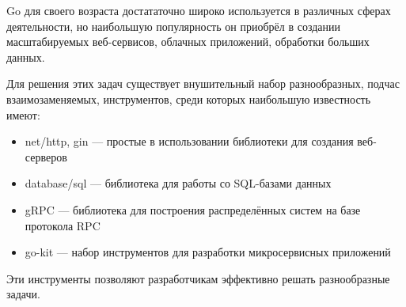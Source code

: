 Go для своего возраста достататочно широко используется в различных сферах деятельности, но наибольшую популярность он приобрёл в создании масштабируемых веб-сервисов, облачных приложений, обработки больших данных.

Для решения этих задач существует внушительный набор разнообразных, подчас взаимозаменяемых, инструментов, среди которых наибольшую известность имеют:

\begin{itemize}
  \item net/http, gin --- простые в использовании библиотеки для создания веб-серверов
  \item database/sql --- библиотека для работы со SQL-базами данных
  \item gRPC --- библиотека для построения распределённых систем на базе протокола RPC
  \item go-kit --- набор инструментов для разработки микросервисных приложений
\end{itemize}

Эти инструменты позволяют разработчикам эффективно решать разнообразные задачи.
